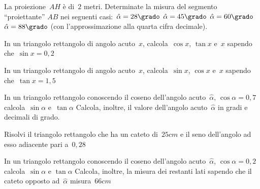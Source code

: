 \begin{multicols}{2}
\begin{esercizio}
\label{ese:G.14}
La proiezione~\(AH\) è di~\(2\) metri. Determinate la misura 
del segmento ``proiettante'' \(AB\) nei seguenti casi:~\({\hat{\alpha}}=28\grado\)
\({\hat{\alpha}}=45\grado\) \({\hat{\alpha}}=60\grado\) \({\hat{\alpha}}=88\grado\) 
(con l'approssimazione alla quarta cifra decimale).
\begin{center} \scalebox{.9}{\proiezionec} \end{center}
\end{esercizio}

\begin{esercizio}
\label{ese:G.16}
In un triangolo rettangolo di angolo acuto~\(x\), calcola~\(\cos x\), \(\tan x\) 
e~\(x\) sapendo che~\(\sin x=0,2\)
\end{esercizio}

\begin{esercizio}
\label{ese:G.17}
In un triangolo rettangolo di angolo acuto~\(x\), calcola~\(\sin x\), \(\cos x\) 
e~\(x\) sapendo che~\(\tan x =1,5\)
\end{esercizio}

\begin{esercizio}
\label{ese:G.18}
In un triangolo rettangolo conoscendo il coseno dell'angolo 
acuto~\(\hat{\alpha}\), \(\cos \alpha = 0,7\) calcola~\(\sin \alpha\) e~\(\tan \alpha\)
Calcola, inoltre, il valore dell'angolo acuto~\(\hat{\alpha}\) in gradi e decimali 
di grado.
\end{esercizio}


\begin{esercizio}
\label{ese:G.20}
Risolvi il triangolo rettangolo che ha un cateto di~\(25\unit{cm}\) e il seno 
dell'angolo ad esso adiacente pari a~\(0,28\)
\end{esercizio}

\begin{esercizio}
\label{ese:G.21}
In un triangolo rettangolo conoscendo il coseno dell'angolo 
acuto~\(\hat{\alpha}\), \(\cos \alpha = 0,2\) calcola~\(\sin \alpha\) e
\(\tan \alpha\) Calcola, inoltre, la misura dei restanti lati sapendo che il 
cateto opposto ad~\(\hat{\alpha}\) misura~\(66\unit{cm}\)
\end{esercizio}
\end{multicols}

